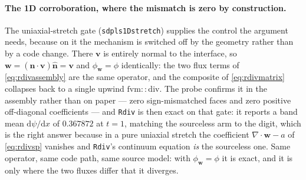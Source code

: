 \documentclass[preprint,3p,11pt]{elsarticle}
\newcommand{\psilev}{\psi}
\newcommand{\nhat}{\hat{\mathbf{n}}}
\begin{document}
\paragraph{The 1D corroboration, where the mismatch is zero by construction.} The
uniaxial-stretch gate (\texttt{sdpls1Dstretch}) supplies the control the argument
needs, because on it the mechanism is switched off by the geometry rather than by
a code change. There $\mathbf{v}$ is entirely normal to the interface, so
$\mathbf{w} = (\nhat\cdot\mathbf{v})\nhat = \mathbf{v}$ and
$\phi_{\mathbf{w}} = \phi$ identically: the two flux terms of
\eqref{eq:rdivassembly} are the same operator, and the composite of
\eqref{eq:rdivmatrix} collapses back to a single upwind $\mathrm{fvm::div}$. The
probe confirms it in the assembly rather than on paper --- zero sign-mismatched
faces and zero positive off-diagonal coefficients --- and \texttt{Rdiv} is then
exact on that gate: it reports a band mean $\mathrm{d}\psilev/\mathrm{d}x$ of
$0.367872$ at $t=1$, matching the sourceless arm to the digit, which is the right
answer because in a pure uniaxial stretch the coefficient
$\nabla\cdot\mathbf{w} - a$ of \eqref{eq:rdivsp} vanishes and \texttt{Rdiv}'s
continuum equation \emph{is} the sourceless one. Same operator, same code path,
same source model: with $\phi_{\mathbf{w}} = \phi$ it is exact, and it is only
where the two fluxes differ that it diverges.
\end{document}
